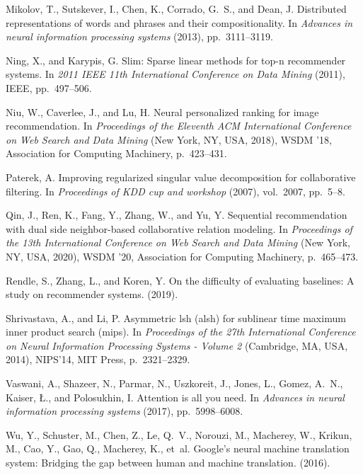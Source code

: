 \documentclass{article}
\begin{document}
\begin{thebibliography}{10}
{\sc Mikolov, T., Sutskever, I., Chen, K., Corrado, G.~S., and Dean, J.}
\newblock Distributed representations of words and phrases and their
  compositionality.
\newblock In {\em Advances in neural information processing systems\/} (2013),
  pp.~3111--3119.

{\sc Ning, X., and Karypis, G.}
\newblock Slim: Sparse linear methods for top-n recommender systems.
\newblock In {\em 2011 IEEE 11th International Conference on Data Mining\/}
  (2011), IEEE, pp.~497--506.

{\sc Niu, W., Caverlee, J., and Lu, H.}
\newblock Neural personalized ranking for image recommendation.
\newblock In {\em Proceedings of the Eleventh ACM International Conference on
  Web Search and Data Mining\/} (New York, NY, USA, 2018), WSDM ’18,
  Association for Computing Machinery, p.~423–431.

{\sc Paterek, A.}
\newblock Improving regularized singular value decomposition for collaborative
  filtering.
\newblock In {\em Proceedings of KDD cup and workshop\/} (2007), vol.~2007,
  pp.~5--8.

{\sc Qin, J., Ren, K., Fang, Y., Zhang, W., and Yu, Y.}
\newblock Sequential recommendation with dual side neighbor-based collaborative
  relation modeling.
\newblock In {\em Proceedings of the 13th International Conference on Web
  Search and Data Mining\/} (New York, NY, USA, 2020), WSDM ’20, Association
  for Computing Machinery, p.~465–473.

{\sc Rendle, S., Zhang, L., and Koren, Y.}
\newblock On the difficulty of evaluating baselines: {A} study on recommender
  systems.
 (2019).

{\sc Shrivastava, A., and Li, P.}
\newblock Asymmetric lsh (alsh) for sublinear time maximum inner product search
  (mips).
\newblock In {\em Proceedings of the 27th International Conference on Neural
  Information Processing Systems - Volume 2\/} (Cambridge, MA, USA, 2014),
  NIPS’14, MIT Press, p.~2321–2329.

{\sc Vaswani, A., Shazeer, N., Parmar, N., Uszkoreit, J., Jones, L., Gomez,
  A.~N., Kaiser, {\L}., and Polosukhin, I.}
\newblock Attention is all you need.
\newblock In {\em Advances in neural information processing systems\/} (2017),
  pp.~5998--6008.

{\sc Wu, Y., Schuster, M., Chen, Z., Le, Q.~V., Norouzi, M., Macherey, W.,
  Krikun, M., Cao, Y., Gao, Q., Macherey, K., et~al.}
\newblock Google's neural machine translation system: Bridging the gap between
  human and machine translation.
 (2016).


\end{thebibliography}
\end{document}
